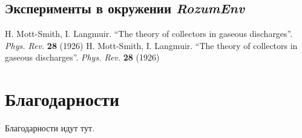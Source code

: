 \documentclass{mipt-thesis-bs}
\begin{document}
\section{Эксперименты в окружении \textit{RozumEnv}}

\backmatter

\begin{thebibliography}{99}
        H. Mott-Smith, I. Langmuir. ``The theory of collectors in gaseous discharges''. \emph{Phys. Rev.} \textbf{28} (1926)
        H. Mott-Smith, I. Langmuir. ``The theory of collectors in gaseous discharges''. \emph{Phys. Rev.} \textbf{28} (1926)
\end{thebibliography}

\chapter{Благодарности}

Благодарности идут тут.
\end{document}
